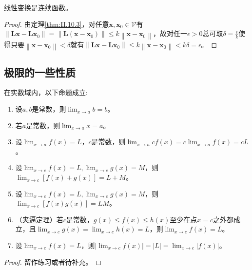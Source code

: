 \documentclass[main.tex]{subfiles}
\begin{document}
\begin{corollary}
线性变换是连续函数。
\end{corollary}
\begin{proof}
由定理\ref{thm:II.10.3}，对任意$\mathbf{x},\mathbf{x}_0\in\mathcal{V}$有$\left\|\mathbf{Lx}-\mathbf{Lx}_0\right\|=\left\|\mathbf{L}\left(\mathbf{x}-\mathbf{x}_0\right)\right\|\leq k\left\|\mathbf{x}-\mathbf{x}_0\right\|$，故对任一$\epsilon>0$总可取$\delta=\frac{\epsilon}{k}$使得只要$\left\|\mathbf{x}-\mathbf{x}_0\right\|<\delta$就有$\left\|\mathbf{Lx}-\mathbf{Lx}_0\right\|\leq k\left\|\mathbf{x}-\mathbf{x}_0\right\|<k\delta=\epsilon$。
\end{proof}

\subsection{极限的一些性质}
\begin{theorem}[极限基本性质]
在实数域内，以下命题成立:
\begin{enumerate}
    \item 设$a,b$是常数，则$\lim_{x\to a}b=b$。
    \item 若$a$是常数，则$\lim_{x\to a} x=a$。
    \item 设$\lim_{x\to a}f\left(x\right)=L$，$c$是常数，则$\lim_{x\to a}cf\left(x\right)=c\lim_{x\to a}f\left(x\right)=cL$。
    \item 设$\lim_{x\to c}f\left(x\right)=L,\lim_{x\to c}g\left(x\right)=M$，则$\lim_{x\to c}\left[f\left(x\right)+g\left(x\right)\right]=L+M$。
    \item 设$\lim_{x\to c}f\left(x\right)=L,\lim_{x\to c}g\left(x\right)=M$，则$\lim_{x\to c}\left[f\left(x\right)g\left(x\right)\right]=LM$。
    \item （夹逼定理）若$c$是常数，$g\left(x\right)\leq f\left(x\right)\leq h\left(x\right)$至少在点$x=c$之外都成立，且$\lim_{x\to c}g\left(x\right)=\lim_{x\to c}h\left(x\right)=L$，则$\lim_{x\to c}f\left(x\right)=L$。
    \item 设$\lim_{x\to c}f\left(x\right)=L$，则$\left|\lim_{x\to c}f\left(x\right)\right|=\left|L\right|=\lim_{x\to c}\left|f\left(x\right)\right|$。
\end{enumerate}
\end{theorem}
\begin{proof}
留作练习或者待补充。
\end{proof}
\end{document}
